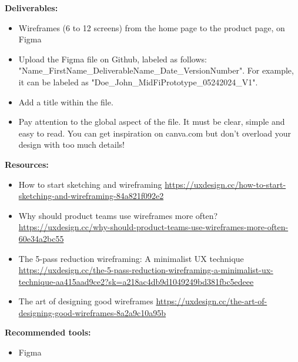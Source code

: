 \textbf{Deliverables:}

\begin{itemize}
\item Wireframes (6 to 12 screens) from the home page to the product page, on Figma
\item Upload the Figma file on Github, labeled as follows: "Name\_FirstName\_DeliverableName\_Date\_VersionNumber". For example, it can be labeled as "Doe\_John\_MidFiPrototype\_05242024\_V1".
\item Add a title within the file.
\item Pay attention to the global aspect of the file. It must be clear, simple and easy to read. You can get inspiration on canva.com but don't overload your design with too much details!
\end{itemize}

\textbf{Resources:}

\begin{itemize}
\item How to start sketching and wireframing \url{https://uxdesign.cc/how-to-start-sketching-and-wireframing-84a821f092e2}
\item Why should product teams use wireframes more often? \url{https://uxdesign.cc/why-should-product-teams-use-wireframes-more-often-60e34a2bc55}
\item The 5-pass reduction wireframing: A minimalist UX technique \url{https://uxdesign.cc/the-5-pass-reduction-wireframing-a-minimalist-ux-technique-aa415aad9ce2?sk=a218ac4db9d1049249bd381fbc5edeee}
\item The art of designing good wireframes \url{https://uxdesign.cc/the-art-of-designing-good-wireframes-8a2a9c10a95b}
\end{itemize}

\textbf{Recommended tools:}

\begin{itemize}
\item Figma
\end{itemize}

